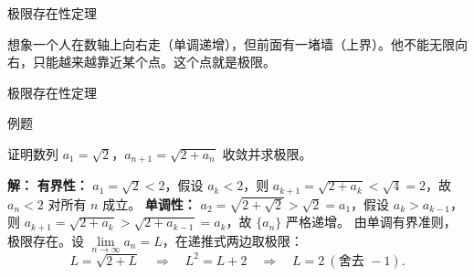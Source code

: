 \documentclass[aspectratio=169,10pt,fontset=fandol]{ctexbeamer}
\newenvironment{custom}[1]{\par\noindent\textbf{#1}\quad}{\par\vspace{0.8em}}
\begin{document}
\begin{frame}[t,fragile]{极限存在性定理}
\footnotesize
{\footnotesize
想象一个人在数轴上向右走（单调递增），但前面有一堵墙（上界）。他不能无限向右，只能越来越靠近某个点。这个点就是极限。

}
\end{frame}
\begin{frame}[t,fragile]{极限存在性定理}
\footnotesize
\begin{block}{例题}
{\footnotesize

证明数列 \(a_1 = \sqrt{2}\)，\(a_{n+1} = \sqrt{2 + a_n}\) 收敛并求极限。

}
\end{block}
\pause
{\footnotesize
\textbf{解：}
\textbf{有界性：} \(a_1=\sqrt{2}<2\)，假设 \(a_k<2\)，则 \(a_{k+1}=\sqrt{2+a_k}<\sqrt4=2\)，故 \(a_n<2\) 对所有 \(n\) 成立。
\textbf{单调性：} \(a_2 = \sqrt{2+\sqrt{2}} > \sqrt{2} = a_1\)，假设 \(a_k > a_{k-1}\)，则 \(a_{k+1} = \sqrt{2 + a_k} > \sqrt{2 + a_{k-1}} = a_k\)，故 \(\{a_n\}\) 严格递增。
由单调有界准则，极限存在。设 \(\lim \limits_{n \to \infty}a_n = L\)，在递推式两边取极限：
\[
L = \sqrt{2 + L} \quad\Longrightarrow\quad L^2 = L + 2 \quad\Longrightarrow\quad L = 2\ (\text{舍去 } -1).
\]

}
\end{frame}
\end{document}
